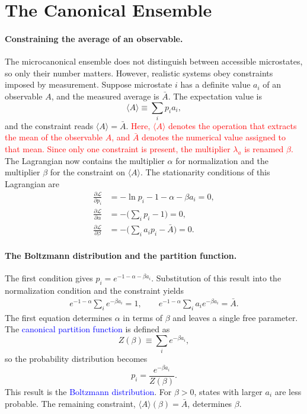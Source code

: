 \section{The Canonical Ensemble}

\paragraph{Constraining the average of an observable.}
The microcanonical ensemble does not distinguish between accessible
microstates, so only their number matters. However, realistic systems obey
constraints imposed by measurement. Suppose microstate $i$ has a definite
value $a_i$ of an observable $A$, and the measured average is $\bar A$. The
expectation value is
\begin{equation}
    \boxed{\langle A\rangle \equiv \sum_i p_i a_i,}
\end{equation}
and the constraint reads $\langle A\rangle=\bar A$.
\textcolor{red}{Here, $\langle A\rangle$ denotes the operation that extracts
the mean of the observable $A$, and $\bar A$ denotes the numerical value
assigned to that mean. Since only one constraint is present, the multiplier
$\lambda_a$ is renamed $\beta$.}
The Lagrangian now contains the multiplier $\alpha$ for normalization and
the multiplier $\beta$ for the constraint on $\langle A\rangle$. The
stationarity conditions of this Lagrangian are
\begin{align*}
    \frac{\partial\mathcal{L}}{\partial p_i}
    &= -\ln p_i-1-\alpha-\beta a_i=0, \\
    \frac{\partial\mathcal{L}}{\partial\alpha}
    &= -\Big(\sum_i p_i-1\Big)=0, \\
    \frac{\partial\mathcal{L}}{\partial\beta}
    &= -\Big(\sum_i a_i p_i-\bar A\Big)=0.
\end{align*}

\paragraph{The Boltzmann distribution and the partition function.}
The first condition gives $p_i = e^{-1-\alpha-\beta a_i}$. Substitution of
this result into the normalization condition and the constraint yields
\begin{align*}
    e^{-1-\alpha}\sum_i e^{-\beta a_i} = 1,
    \qquad
    e^{-1-\alpha}\sum_i a_i e^{-\beta a_i} = \bar A.
\end{align*}
The first equation determines $\alpha$ in terms of $\beta$ and leaves a
single free parameter. The \textcolor{blue}{canonical partition function} is
defined as
\begin{equation}
    \boxed{Z(\beta) \equiv \sum_i e^{-\beta a_i},}
\end{equation}
so the probability distribution becomes
\begin{equation}
    \boxed{p_i = \frac{e^{-\beta a_i}}{Z(\beta)}.}
\end{equation}
This result is the \textcolor{blue}{Boltzmann distribution}. For $\beta>0$,
states with larger $a_i$ are less probable. The remaining constraint,
$\langle A\rangle(\beta)=\bar A$, determines $\beta$.

